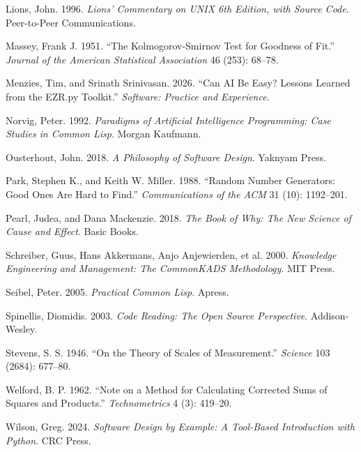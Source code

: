 \documentclass[
  justified]{tufte-book}
\newlength{\cslhangindent}
\newenvironment{CSLReferences}[2] %
 {\begin{list}{}{%
  \setlength{\itemindent}{0pt}
  \setlength{\leftmargin}{0pt}
  \setlength{\parsep}{0pt}
  \ifodd #1
   \setlength{\leftmargin}{\cslhangindent}
   \setlength{\itemindent}{-1\cslhangindent}
  \fi
  \setlength{\itemsep}{#2\baselineskip}}}
 {\end{list}}
\begin{document}
\begin{CSLReferences}{1}{1}
Lions, John. 1996. \emph{Lions' Commentary on {UNIX} 6th Edition, with
Source Code}. Peer-to-Peer Communications.

Massey, Frank J. 1951. {``The {Kolmogorov-Smirnov} Test for Goodness of
Fit.''} \emph{Journal of the American Statistical Association} 46 (253):
68--78.

Menzies, Tim, and Srinath Srinivasan. 2026. {``Can {AI} Be Easy? Lessons
Learned from the {EZR.py} Toolkit.''} \emph{Software: Practice and
Experience}.

Norvig, Peter. 1992. \emph{Paradigms of Artificial Intelligence
Programming: Case Studies in Common Lisp}. Morgan Kaufmann.

Ousterhout, John. 2018. \emph{A Philosophy of Software Design}. Yaknyam
Press.

Park, Stephen K., and Keith W. Miller. 1988. {``Random Number
Generators: Good Ones Are Hard to Find.''} \emph{Communications of the
ACM} 31 (10): 1192--201.

Pearl, Judea, and Dana Mackenzie. 2018. \emph{The Book of Why: The New
Science of Cause and Effect}. Basic Books.

Schreiber, Guus, Hans Akkermans, Anjo Anjewierden, et al. 2000.
\emph{Knowledge Engineering and Management: The {CommonKADS}
Methodology}. MIT Press.

Seibel, Peter. 2005. \emph{Practical Common Lisp}. Apress.

Spinellis, Diomidis. 2003. \emph{Code Reading: The Open Source
Perspective}. Addison-Wesley.

Stevens, S. S. 1946. {``On the Theory of Scales of Measurement.''}
\emph{Science} 103 (2684): 677--80.

Welford, B. P. 1962. {``Note on a Method for Calculating Corrected Sums
of Squares and Products.''} \emph{Technometrics} 4 (3): 419--20.

Wilson, Greg. 2024. \emph{Software Design by Example: A Tool-Based
Introduction with Python}. CRC Press.

\end{CSLReferences}

\backmatter
\end{document}
